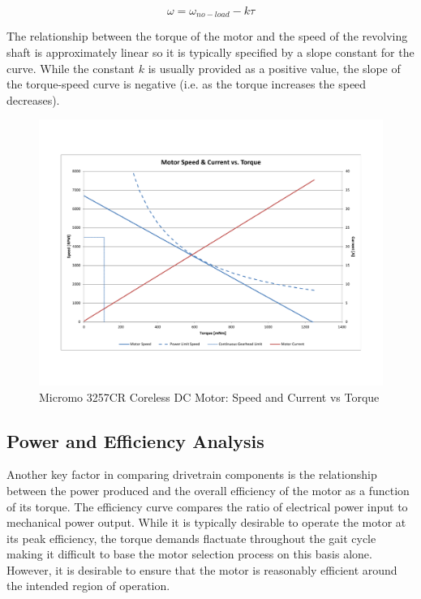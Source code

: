 \begin{equation}
	\omega = \omega_{no-load} - k\tau
\end{equation}

The relationship between the torque of the motor and the speed of the revolving shaft is approximately linear so it is typically specified by a slope constant for the curve. While the constant $k$ is usually provided as a positive value, the slope of the torque-speed curve is negative (i.e. as the torque increases the speed decreases). 

\begin{figure}[!ht]
	\begin{center}
    \includegraphics[trim = 20mm 30mm 20mm 30mm,clip,width=15cm]{fig/design/motor1.pdf}
	\end{center}
  \caption{Micromo 3257CR Coreless DC Motor: Speed and Current vs Torque}
\end{figure}


\subsection{Power and Efficiency Analysis} %
\label{sub:power_and_efficiency_analysis}
Another key factor in comparing drivetrain components is the relationship between the power produced and the overall efficiency of the motor as a function of its torque. The efficiency curve compares the ratio of electrical power input to mechanical power output. While it is typically desirable to operate the motor at its peak efficiency, the torque demands flactuate throughout the gait cycle making it difficult to base the motor selection process on this basis alone. However, it is desirable to ensure that the motor is reasonably efficient around the intended region of operation. 

